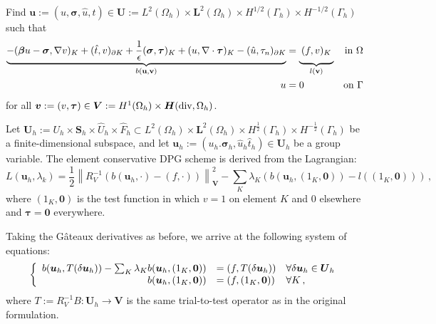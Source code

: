\documentclass[letterpaper]{article}
\def\btau{\boldsymbol\tau}
\def\bsigma{\boldsymbol\sigma}
\def\bbeta{\boldsymbol\beta}
\newcommand{\bs}[1]{\boldsymbol{#1}}
\newcommand{\norm}[1]{\left\| #1 \right\|}
\newcommand{\bfH}{\mbox{\boldmath $H$}}
\begin{document}
Find
$\bs u:=(u,\bsigma,\hat u,\hat t)
\in\bs U:=L^2(\Omega_h)\times \bs L^2(\Omega_h)\times H^{1/2}(\Gamma_h)\times H^{-1/2}(\Gamma_h)$ 
such that
\begin{align}
\label{eq:variationalFormulation}
\underbrace{-(\bbeta u-\bsigma,\nabla v)_K+(\hat t,v)_{\partial K}
+ \frac{1}{\epsilon}(\bsigma,\btau)_K
+(u,\nabla\cdot\btau)_K
-(\hat u,\tau_n)_{\partial K}}_{b(\mathbf{u}, \mathbf{v})}
&=\underbrace{\:(f,v)_K\genfrac{}{}{0pt}{}{}{}}_{l(\mathbf{v})} &\text{in }\Omega \\
u&=0 &\text{on }\Gamma\\
\end{align}
for all $\bs v:=(v,\btau)\in
\bs V:=H^1(\Omega_h)\times\bfH(\text{div},\Omega_h)$.

Let $\bs U_h:=U_h\times\bs S_h\times\hat U_h\times\hat F_h\subset L^2(\Omega_h)\times\bs
L^2(\Omega_h)\times H^{\frac{1}{2}}(\Gamma_h)\times H^{-\frac{1}{2}}(\Gamma_h)$
be a finite-dimensional subspace, and let $\bs u_h:=(u_h.\bsigma_h,\hat
u_h\hat t_h)\in\bs U_h$ be a group variable. The element conservative DPG scheme is
derived from the Lagrangian:
\begin{equation}
L(\bs u_h,\lambda_k)=\frac{1}{2}\norm{R_V^{-1}(b(\bs
u_h,\cdot)-(f,\cdot))}^2_{\bs V}-\sum_K\lambda_K(b(\bs u_h,(1_K,\bs0))-l((1_K,\bs0)))\,,
\label{eq:lagrangian}
\end{equation}
where $(1_K,\bs0)$ is the test function in which $v=1$ on element $K$ and 0 elsewhere and $\btau=\bs0$ everywhere.

Taking the G\^ateaux derivatives as before, we arrive at the following system
of equations:
\begin{equation}
\left\{
\begin{array}[c]{rll}
b(\bs u_h,T(\delta\bs u_h))-\sum_K\lambda_K b(\bs u_h,(1_K,\bs0))
&=(f,T(\delta\bs u_h)) & \forall\delta\bs u_h\in\bs U_h\\
b(\bs u_h,(1_K,\bs0)) &=(f,(1_K,\bs0)) & \forall K\,,
\end{array}
\right.
\label{eq:conservativeSystem}
\end{equation}
where $T:=R_V^{-1}B:\bs U_h\rightarrow\bs V$ is the same trial-to-test operator as in the original formulation.
\end{document}
